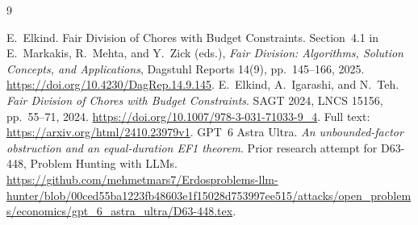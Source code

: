 \documentclass[11pt]{article}
\begin{document}
\begin{thebibliography}{9}
\raggedright
{}
E.~Elkind. Fair Division of Chores with Budget Constraints.
Section~4.1 in E.~Markakis, R.~Mehta, and Y.~Zick (eds.),
\emph{Fair Division: Algorithms, Solution Concepts, and Applications},
Dagstuhl Reports 14(9), pp.~145--166, 2025.
\url{https://doi.org/10.4230/DagRep.14.9.145}.
E.~Elkind, A.~Igarashi, and N.~Teh.
\emph{Fair Division of Chores with Budget Constraints}.
SAGT 2024, LNCS 15156, pp.~55--71, 2024.
\url{https://doi.org/10.1007/978-3-031-71033-9_4}.
Full text: \url{https://arxiv.org/html/2410.23979v1}.
GPT~6 Astra Ultra. \emph{An unbounded-factor obstruction and an
equal-duration EF1 theorem}. Prior research attempt for D63-448,
Problem Hunting with LLMs.
\url{https://github.com/mehmetmars7/Erdosproblems-llm-hunter/blob/00ced55ba1223fb48603e1f15028d753997ee515/attacks/open_problems/economics/gpt_6_astra_ultra/D63-448.tex}.
\end{thebibliography}
\end{document}
